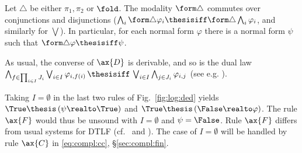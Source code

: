 \begin{example}
\label{ex:log:modalnf}
Let $\triangle$ be either $\pi_1,\pi_2$ or $\fold$.
The modality $\form\triangle$ commutes over conjunctions and disjunctions
($\bigwedge_i \form\triangle \varphi_i \thesisiff \form\triangle\bigwedge_i \varphi_i$,
and similarly for $\bigvee$).
In particular, for each normal form $\varphi$
there is a normal form $\psi$ such that $\form\triangle \varphi \thesisiff \psi$.
\end{example}

\begin{example}
\label{ex:log:distr}
As usual, the converse of $\ax{D}$ is derivable, and so is the dual
law
\(
  \bigwedge_{f \in \prod_{i \in I}J_i}\bigvee_{i \in I} \varphi_{i,f(i)}
  \,\thesisiff\,
  \bigvee_{i \in I}\bigwedge_{j \in J_i}\varphi_{i,j}
\)
(see e.g. \cite[Lemma VII.1.10]{johnstone82book}).
\end{example}

\begin{remark}
\label{rem:log:realto}
Taking $I = \emptyset$ in the last two rules of Fig.~\ref{fig:log:ded}
yields $\True \thesis \left(\psi \realto \True \right)$
and $\True \thesis \left(\False \realto \varphi \right)$.
The rule $\ax{F}$ would thus be unsound with $I = \emptyset$ and $\psi = \False$.
Rule $\ax{F}$ differs from usual systems for DTLF
(cf.\ \cite[\S 4.2]{abramsky91apal} \cite[Figure 5]{bk03ic}
and \cite[Figure 10.3]{ac98book}).
The case of $I = \emptyset$
will be handled by rule $\ax{C}$ in \eqref{eq:compl:cc}, \S\ref{sec:compl:fin}.
\end{remark}



